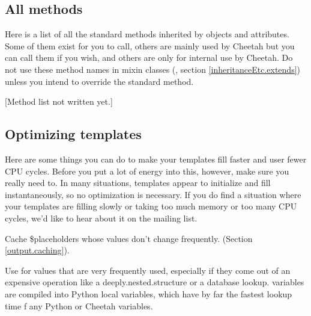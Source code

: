 \subsection{All methods}
\label{tips.allMethods}

Here is a list of all the standard methods inherited by  objects
and attributes.  Some of them exist for you to call, others are mainly used by
Cheetah but you can call them if you wish, and others are only for internal use
by Cheetah.  Do not use these method names in mixin classes (,
section \ref{inheritanceEtc.extends}) unless you intend to override the
standard method.  

[Method list not written yet.]

\subsection{Optimizing templates}
\label{tips.optimizing}

Here are some things you can do to make your templates fill faster and user
fewer CPU cycles.  Before you put a lot of energy into this, however, make
sure you really need to.  In many situations, templates appear to initialize
and fill instantaneously, so no optimization is necessary.  If you do find a
situation where your templates are filling slowly or taking too much memory or
too many CPU cycles, we'd like to hear about it on the mailing list.

Cache \$placeholders whose values don't change frequently.  (Section
\ref{output.caching}).

Use  for values that are very frequently used, especially if they
come out of an expensive operation like a deeply.nested.structure or a
database lookup.   variables are compiled into Python local
variables, which have by far the fastest lookup time f any Python or Cheetah
variables.






